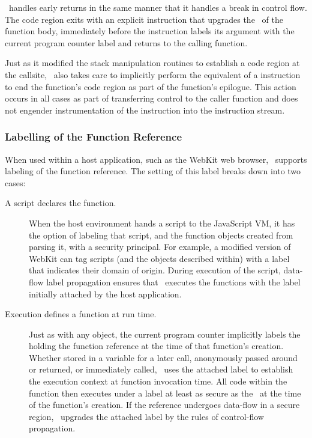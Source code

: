 \FlowCore\ handles early returns in the same manner that it handles a break in control flow.
The code region exits with an explicit \popj instruction that upgrades the \pclabel\ of the function body, immediately before the  instruction labels its argument with the current program counter label and returns to the calling function.

Just as it modified the stack manipulation routines to establish a code region at the callsite, \FlowCore\ also takes care to implicitly perform the equivalent of a \popj instruction to end the function's code region as part of the function's epilogue.
This action occurs in all cases as part of transferring control to the caller function and does not engender instrumentation of the \popj instruction into the instruction stream.

\subsubsection{Labelling of the Function Reference}

When used within a host application, such as the WebKit web browser, \FlowCore\ supports labeling of the function reference.
The setting of this label breaks down into two cases:
\begin{description}
 \item [A script declares the function.]
  When the host environment hands a script to the JavaScript VM, it has the option of labeling that script, and the function objects created from parsing it, with a security principal.
  For example, a modified version of WebKit can tag scripts (and the objects described within) with a label that indicates their domain of origin.
  During execution of the script, data-flow label propagation ensures that \FlowCore\ executes the functions with the label initially attached by the host application.
 \item [Execution defines a function at run time.]
   Just as with any object, the current program counter implicitly labels the  holding the function reference at the time of that function's creation.
  Whether stored in a variable for a later call, anonymously passed around or returned, or immediately called, \FlowCore\ uses the attached label to establish the execution context at function invocation time.
  All code within the function then executes under a label at least as secure as the \pclabel\ at the time of the function's creation.
  If the reference undergoes data-flow in a secure region, \FlowCore\ upgrades the attached label by the rules of control-flow propagation.
\end{description}


